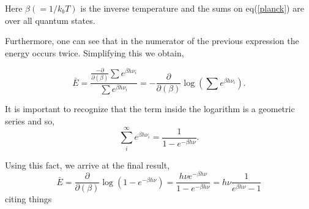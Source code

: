 \documentclass[10pt,twoside,openright]{memoir}
\begin{document}
Here $\beta (= 1/k_b T)$ is the inverse temperature and the sums on eq(\ref{planck}) are over all quantum states.

Furthermore, one can see that in the numerator of the previous expression the energy occurs twice. Simplifying this we obtain,

$$\bar{E} = \frac{\frac{-\partial}{\partial (\beta)} \sum e^{\beta h \nu_i} }{\sum e^{\beta h \nu_i}} = -\frac{\partial}{\partial (\beta)} \log \left(\sum e^{\beta h \nu_i} \right). $$

It is important to recognize that the term inside the logarithm is a geometric series and so,
\begin{equation}
\sum_{i}^{\infty} e^{\beta h \nu_i} = \frac{1}{1-e^{-\beta h \nu}}.
\end{equation}

Using this fact, we arrive at the final result,
$$ \bar{E} = \frac{\partial}{\partial (\beta)} \log \left( 1 - e^{-\beta h \nu} \right) = \frac{h \nu e^{-\beta h \nu}}{1 - e^{-\beta h \nu}} = h\nu \frac{1}{e^{\beta h \nu} - 1} $$
citing things 



%
%


\end{document}
